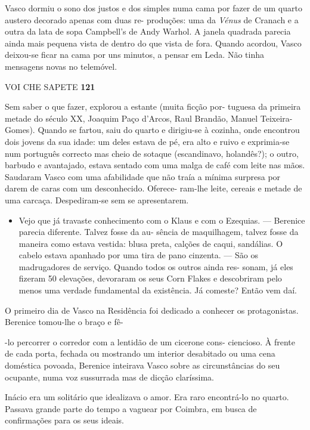Vasco dormiu o sono dos justos e dos simples numa cama por fazer de um
quarto austero decorado apenas com duas re- produções: uma da
\emph{Vénus }de Cranach e a outra da lata de sopa Campbell's de Andy
Warhol. A janela quadrada parecia ainda mais pequena vista de dentro do
que vista de fora. Quando acordou, Vasco deixou-se ficar na cama por uns
minutos, a pensar em Leda. Não tinha mensagens novas no telemóvel.

VOI CHE SAPETE \textbf{121}

Sem saber o que fazer, explorou a estante (muita ficção por- tuguesa da
primeira metade do século XX, Joaquim Paço d'Arcos, Raul Brandão, Manuel
Teixeira-Gomes). Quando se fartou, saiu do quarto e dirigiu-se à
cozinha, onde encontrou dois jovens da sua idade: um deles estava de pé,
era alto e ruivo e exprimia-se num português correcto mas cheio de
sotaque (escandinavo, holandês?); o outro, barbudo e avantajado, estava
sentado com uma malga de café com leite nas mãos. Saudaram Vasco com uma
afabilidade que não traía a mínima surpresa por darem de caras com um
desconhecido. Oferece- ram-lhe leite, cereais e metade de uma carcaça.
Despediram-se sem se apresentarem.

\begin{itemize}
\tightlist
\item
  Vejo que já travaste conhecimento com o Klaus e com o Ezequias. ---
  Berenice parecia diferente. Talvez fosse da au- sência de maquilhagem,
  talvez fosse da maneira como estava vestida: blusa preta, calções de
  caqui, sandálias. O cabelo estava apanhado por uma tira de pano
  cinzenta. --- São os madrugadores de serviço. Quando todos os outros
  ainda res- sonam, já eles fizeram 50 elevações, devoraram os seus Corn
  Flakes e descobriram pelo menos uma verdade fundamental da existência.
  Já comeste? Então vem daí.
\end{itemize}

O primeiro dia de Vasco na Residência foi dedicado a conhecer os
protagonistas. Berenice tomou-lhe o braço e fê-

-lo percorrer o corredor com a lentidão de um cicerone cons- ciencioso.
À frente de cada porta, fechada ou mostrando um interior desabitado ou
uma cena doméstica povoada, Berenice inteirava Vasco sobre as
circunstâncias do seu ocupante, numa voz sussurrada mas de dicção
claríssima.

Inácio era um solitário que idealizava o amor. Era raro encontrá-lo no
quarto. Passava grande parte do tempo a vaguear por Coimbra, em busca de
confirmações para os seus ideais.

